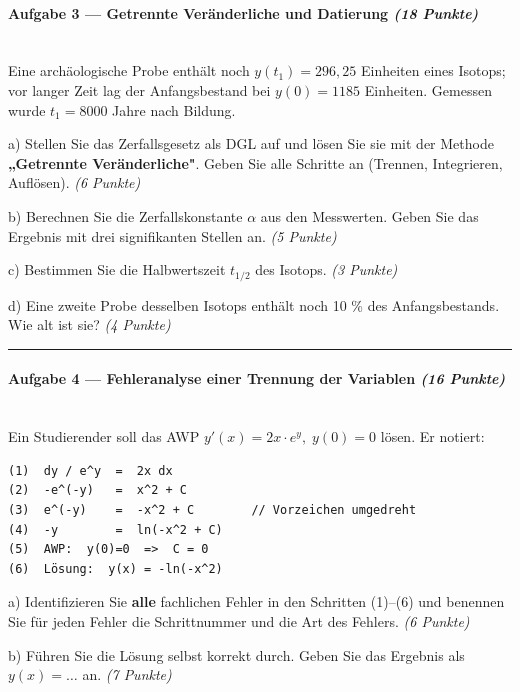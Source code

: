 \documentclass[11pt, a4paper]{article}
\begin{document}
\paragraph{Aufgabe 3 — Getrennte Veränderliche und Datierung \textit{(18 Punkte)}}\mbox{}\\[2pt]

Eine archäologische Probe enthält noch $y(t_1) = 296{,}25$ Einheiten eines Isotops; vor langer Zeit lag der Anfangsbestand bei $y(0) = 1185$ Einheiten. Gemessen wurde $t_1 = 8000$ Jahre nach Bildung.


a) Stellen Sie das Zerfallsgesetz als DGL auf und lösen Sie sie mit der Methode \textbf{„Getrennte Veränderliche"}. Geben Sie alle Schritte an (Trennen, Integrieren, Auflösen). \textit{(6 Punkte)}


b) Berechnen Sie die Zerfallskonstante $\alpha$ aus den Messwerten. Geben Sie das Ergebnis mit drei signifikanten Stellen an. \textit{(5 Punkte)}


c) Bestimmen Sie die Halbwertszeit $t_{1/2}$ des Isotops. \textit{(3 Punkte)}


d) Eine zweite Probe desselben Isotops enthält noch 10 \% des Anfangsbestands. Wie alt ist sie? \textit{(4 Punkte)}



\noindent\textcolor{rulegray}{\rule{\linewidth}{0.4pt}}


\paragraph{Aufgabe 4 — Fehleranalyse einer Trennung der Variablen \textit{(16 Punkte)}}\mbox{}\\[2pt]

Ein Studierender soll das AWP $y'(x) = 2x \cdot e^y, \; y(0) = 0$ lösen. Er notiert:


\begin{lstlisting}
(1)  dy / e^y  =  2x dx
(2)  -e^(-y)   =  x^2 + C
(3)  e^(-y)    =  -x^2 + C        // Vorzeichen umgedreht
(4)  -y        =  ln(-x^2 + C)
(5)  AWP:  y(0)=0  =>  C = 0
(6)  Lösung:  y(x) = -ln(-x^2)
\end{lstlisting}


a) Identifizieren Sie \textbf{alle} fachlichen Fehler in den Schritten (1)–(6) und benennen Sie für jeden Fehler die Schrittnummer und die Art des Fehlers. \textit{(6 Punkte)}


b) Führen Sie die Lösung selbst korrekt durch. Geben Sie das Ergebnis als $y(x) = \dots$ an. \textit{(7 Punkte)}
\end{document}
